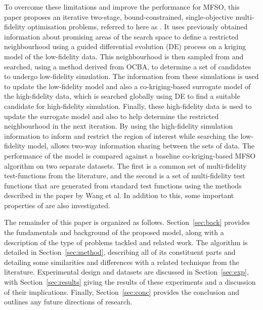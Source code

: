 To overcome these limitations and improve the performance for MFSO, this paper proposes an iterative two-stage, bound-constrained, single-objective multi-fidelity optimisation problems, referred to here as \AlgName{}. It uses previously obtained information about promising areas of the search space to define a restricted neighbourhood using a guided differential evolution (DE) process on a kriging model of the low-fidelity data. This neighbourhood is then sampled from and searched, using a method derived from OCBA, to determine a set of candidates to undergo low-fidelity simulation. The information from these simulations is used to update the low-fidelity model and also a co-kriging-based surrogate model of the high-fidelity data, which is searched globally using DE to find a suitable candidate for high-fidelity simulation. Finally, these high-fidelity data is used to update the surrogate model and also to help determine the restricted neighbourhood in the next iteration. By using the high-fidelity simulation information to inform and restrict the region of interest while searching the low-fidelity model, \AlgName{} allows two-way information sharing between the sets of data. The performance of the \AlgName{} model is compared against a baseline co-kriging-based MFSO algorithm on two separate datasets. The first is a common set of multi-fidelity test-functions from the literature, and the second is a set of multi-fidelity test functions that are generated from standard test functions using the methods described in the paper by Wang et al. In addition to this, some important properties of \AlgName{} are also investigated.

The remainder of this paper is organized as follows. Section~\ref{sec:back} provides the fundamentals and background of the proposed model, along with a description of the type of problems tackled and related work. The \AlgName{} algorithm is detailed in Section~\ref{sec:method}, describing all of its constituent parts and detailing some similarities and differences with a related technique from the literature. Experimental design and datasets are discussed in Section~\ref{sec:exp}, with Section~\ref{sec:results} giving the results of these experiments and a discussion of their implications. Finally, Section~\ref{sec:conc} provides the conclusion and outlines any future directions of research.

